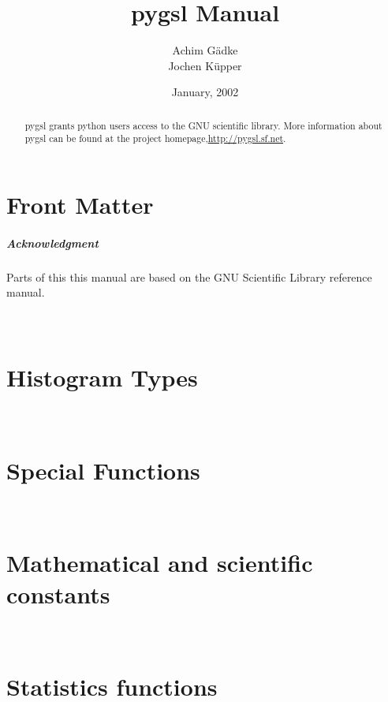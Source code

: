 \documentclass{manual}
\title{pygsl Manual}
\author{Achim G\"adke\makebox[0pt]{ \footnotemark[1]} \\
Jochen K\"upper}
\date{January, 2002}            %
\makeatletter
\let\py@OldOldChapter=\chapter
\renewcommand{\chapter}{\py@reset%
                        \py@OldOldChapter}
\newcommand{\GSL}{GNU Scientific Library}
\makeatother
\begin{document}
\maketitle

\ifhtml
\chapter*{Front Matter}
\label{front}
\fi



\begin{abstract}
   \noindent
   pygsl grants python users access to the GNU scientific library.
   More information about pygsl can be found at the project
   homepage,\url{http://pygsl.sf.net}.
\end{abstract}

\paragraph*{Acknowledgment}
\label{sec:acknowledgment}

Parts of this this manual are based on the \GSL{} reference manual.

\tableofcontents


\chapter[\protect\module{pygsl.histogram} --- Histogram Types]
{\protect{} \\ Histogram Types}
\label{cha:histogram-module}


\chapter[\protect\module{pygsl.sf} --- Special Functions]
{\protect{} \\ Special Functions}
\label{cha:sf-module}


\chapter[\protect\module{pygsl.const} --- Mathematical and scientific
constants]{\protect{} \\ Mathematical and scientific
constants} 
\label{cha:const-module}


\chapter[\protect\module{pygsl.statistics} --- Statistics
functions]{\protect{} \\ Statistics functions}
\label{cha:statistics-module}

\end{document}
